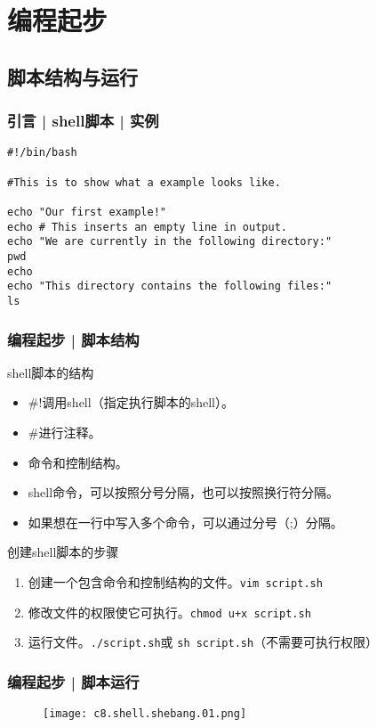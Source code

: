\section{编程起步}
\subsection{脚本结构与运行}
\begin{frame}[fragile]
  \frametitle{引言 | shell脚本 | 实例}
\begin{lstlisting}
#!/bin/bash

#This is to show what a example looks like.

echo "Our first example!"
echo # This inserts an empty line in output.
echo "We are currently in the following directory:"
pwd
echo
echo "This directory contains the following files:"
ls
\end{lstlisting}
\end{frame}

\begin{frame}[fragile]
  \frametitle{编程起步 | \alert{脚本结构}}
  \begin{block}{shell脚本的结构}
    \begin{itemize}
      \item \#!调用shell（指定执行脚本的shell）。
      \item \#进行注释。
      \item 命令和控制结构。
      \item shell命令，可以按照分号分隔，也可以按照换行符分隔。
      \item 如果想在一行中写入多个命令，可以通过分号（;）分隔。
    \end{itemize}
  \end{block}
  \pause
  \begin{block}{创建shell脚本的步骤}
    \begin{enumerate}
      \item 创建一个包含命令和控制结构的文件。\verb|vim script.sh|
      \item 修改文件的权限使它可执行。\verb|chmod u+x script.sh|
      \item 运行文件。\verb|./script.sh|或 \verb|sh script.sh|（不需要可执行权限）
    \end{enumerate}
  \end{block}
\end{frame}

\begin{frame}
  \frametitle{编程起步 | 脚本运行}
  \begin{figure}
    \centering
    \texttt{[image: c8.shell.shebang.01.png]}
  \end{figure}
\end{frame}

